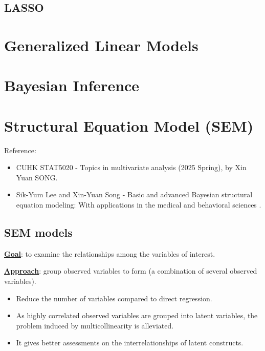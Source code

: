 \documentclass[10pt,a4paper]{book}
\begin{document}
\section{LASSO}\label{sec:lasso}




\chapter{Generalized Linear Models}\label{chap:GLM}



\chapter{Bayesian Inference}\label{chap:bayes_inference}



\chapter{Structural Equation Model (SEM)}\label{chap:SEM}
Reference: 
\begin{itemize}
	\item CUHK STAT5020 - Topics in multivariate analysis (2025 Spring), by Xin Yuan SONG.
	\item Sik-Yum Lee and Xin-Yuan Song - Basic and advanced
	Bayesian structural equation modeling: With applications in the
	medical and behavioral sciences \cite{lee2012basic}.
\end{itemize}

\section{SEM models}\label{sec:SEM_models}

\noindent \textbf{\underline{Goal}}: to examine the relationships among the variables of interest.

\noindent \textbf{\underline{Approach}}: group observed variables to form  (a combination of several observed variables).
\begin{itemize}
	\item Reduce the number of variables compared to direct regression.
	\item As highly correlated observed variables are grouped into latent variables, the problem induced by multicollinearity is alleviated.
	\item It gives better assessments on the interrelationships of latent constructs.
\end{itemize}
\end{document}
